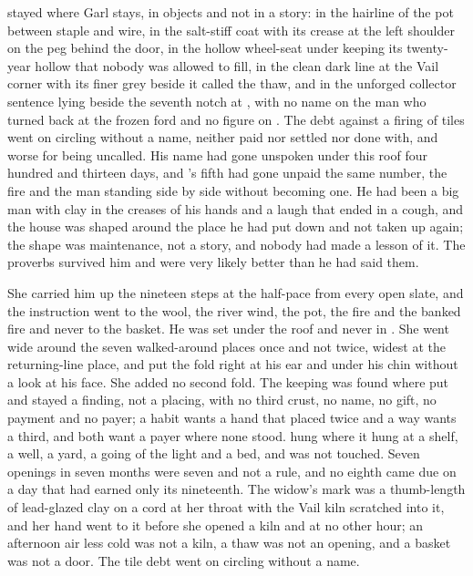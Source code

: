  stayed where Garl stays, in objects and not in a story: in the hairline of the pot between staple and wire, in the salt-stiff coat with its crease at the left shoulder on the peg behind the door, in the hollow wheel-seat under  keeping its twenty-year hollow that nobody was allowed to fill, in the clean dark line at the Vail corner with its finer grey beside it called the thaw, and in the unforged collector sentence lying beside the seventh notch at , with no name on the man who turned back at the frozen ford and no figure on . The debt against a firing of tiles went on circling without a name, neither paid nor settled nor done with, and worse for being uncalled. His name had gone unspoken under this roof four hundred and thirteen days, and 's fifth had gone unpaid the same number, the fire and the man standing side by side without becoming one. He had been a big man with clay in the creases of his hands and a laugh that ended in a cough, and the house was shaped around the place he had put down and not taken up again; the shape was maintenance, not a story, and nobody had made a lesson of it. The proverbs survived him and were very likely better than he had said them.

She carried him up the nineteen steps at the half-pace from every open slate, and the instruction went to the wool, the river wind, the pot, the fire and the banked fire and never to the basket. He was set under the roof and never in . She went wide around the seven walked-around places once and not twice, widest at the returning-line place, and put the fold right at his ear and under his chin without a look at his face. She added no second fold. The keeping was found where put and stayed a finding, not a placing, with no third crust, no name, no gift, no payment and no payer; a habit wants a hand that placed twice and a way wants a third, and both want a payer where none stood.  hung where it hung at a shelf, a well, a yard, a going of the light and a bed, and was not touched. Seven openings in seven months were seven and not a rule, and no eighth came due on a day that had earned only its nineteenth. The widow's mark was a thumb-length of lead-glazed clay on a cord at her throat with the Vail kiln scratched into it, and her hand went to it before she opened a kiln and at no other hour; an afternoon air less cold was not a kiln, a thaw was not an opening, and a basket was not a door. The tile debt went on circling without a name.

